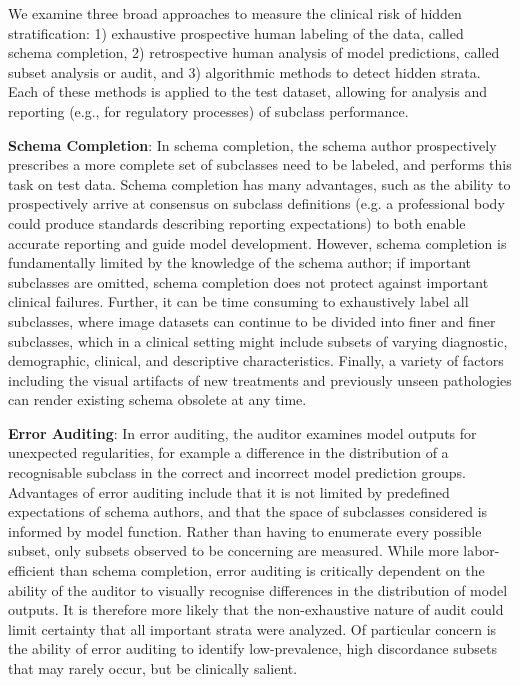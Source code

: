 \documentclass{article}
\begin{document}
We examine three broad approaches to measure the clinical risk of hidden stratification: 1) exhaustive prospective human labeling of the data, called schema completion, 2) retrospective human analysis of model predictions, called subset analysis or audit, and 3) algorithmic methods to detect hidden strata.  Each of these methods is applied to the test dataset, allowing for analysis and reporting (e.g., for regulatory processes) of subclass performance.

\textbf{Schema Completion}: In schema completion, the schema author prospectively prescribes a more complete set of subclasses need to be labeled, and performs this task on test data. 
Schema completion has many advantages, such as the ability to prospectively arrive at consensus on subclass definitions (e.g. a professional body could produce standards describing reporting expectations) to both enable accurate reporting and guide model development.
However, schema completion is fundamentally limited by the knowledge of the schema author; if important subclasses are omitted, schema completion does not protect against important clinical failures.
Further, it can be time consuming to exhaustively label all subclasses, where image datasets can continue to be divided into finer and finer subclasses, which in a clinical setting might include subsets of varying diagnostic, demographic, clinical, and descriptive characteristics.
Finally, a variety of factors including the visual artifacts of new treatments and previously unseen pathologies can render existing schema obsolete at any time.

\textbf{Error Auditing}: In error auditing, the auditor examines model outputs for unexpected regularities, for example a difference in the distribution of a recognisable subclass in the correct and incorrect model prediction groups. 
Advantages of error auditing include that it is not limited by predefined expectations of schema authors, and that the space of subclasses considered is informed by model function.
Rather than having to enumerate every possible subset, only subsets observed to be concerning are measured.
While more labor-efficient than schema completion, error auditing is critically dependent on the ability of the auditor to visually recognise differences in the distribution of model outputs.
It is therefore more likely that the non-exhaustive nature of audit could limit certainty that all important strata were analyzed.
Of particular concern is the ability of error auditing to identify low-prevalence, high discordance subsets that may rarely occur, but be clinically salient.
\end{document}
